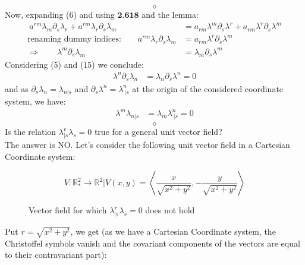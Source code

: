 $$\diamond$$
Now, expanding (6) and using $\textbf{2.618}$ and the lemma:
\begin{align}
\ a^{rm}\lambda_m\partial_s \lambda_r+ a^{rm} \lambda_r \partial_s \lambda_m &= a_{rm} \lambda^m \partial_s \lambda^r + a_{rm} \lambda^r \partial_s \lambda^m\\
\text{renaming dummy indices:}\quad\quad   a^{rm} \lambda_r \partial_s \lambda_m &= a_{rm} \lambda^r \partial_s \lambda^m \\
\Rightarrow\quad\quad \lambda^m \partial_s \lambda_m &= \lambda_m \partial_s \lambda^m
\end{align}
Considering (5) and (15) we conclude:
\begin{align}
\lambda^n \partial_s \lambda_n &= \lambda_n \partial_s \lambda^n = 0
\end{align}
and as $\partial_s \lambda_n = \lambda_{n|s} $ and $\partial_s \lambda^n = \lambda^n_{\ |s} $ at the origin of the considered coordinate system, we have:
\begin{align}
\lambda^m \lambda_{n|s} &= \lambda_m \lambda^n_{\ |s} = 0
\end{align}
$$\diamond$$
Is the relation $\lambda^r_{|s}\lambda_s = 0$ true for a general unit vector field?\\
The answer is NO. Let's consider the following unit vector field in a Cartesian Coordinate system:
\begin{figure}[H]

\centering
\begin{minipage}[H]{.4\textwidth}

\vspace{0pt}

\end{minipage}\hfill
\begin{minipage}[H]{0.4\textwidth}
\vspace{50pt}
$$V:\mathbb{R}_*^2\rightarrow \mathbb{R}^2|V(x,y) = \left< \frac{x}{\sqrt{x^2+y^2}},-\frac{y}{\sqrt{x^2+y^2}} \right>$$
\end{minipage}
\caption{Vector field for which $\lambda^r_{|s}\lambda_s = 0$ does not hold}
\end{figure}
Put $ r = \sqrt{x^2+y^2}$, we get (as we have a Cartesian Coordinate system, the  Christoffel symbols vanish and the covariant components of the vectors are equal to their contravariant part):
\newpage
